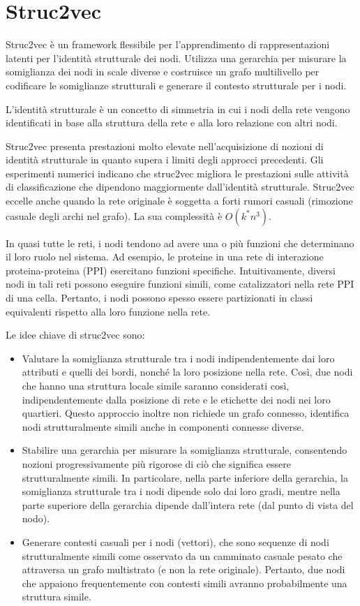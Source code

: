 \documentclass[11pt]{article}
\begin{document}
\pagebreak
\section{Struc2vec}
Struc2vec è un framework flessibile per l'apprendimento di rappresentazioni latenti per l'identità strutturale dei nodi.
Utilizza una gerarchia per misurare la somiglianza dei nodi in scale diverse e costruisce un grafo multilivello per codificare le somiglianze strutturali e generare il contesto strutturale per i nodi.

L'identità strutturale è un concetto di simmetria in cui i nodi della rete vengono identificati in base alla struttura della rete e alla loro relazione con altri nodi.

Struc2vec presenta prestazioni molto elevate nell'acquisizione di nozioni di identità strutturale in quanto supera i limiti degli approcci precedenti.
Gli esperimenti numerici indicano che struc2vec migliora le prestazioni sulle attività di classificazione che dipendono maggiormente dall'identità strutturale.
Struc2vec eccelle anche quando la rete originale è soggetta a forti rumori casuali (rimozione casuale degli archi nel grafo).
La sua complessità è $O(k^*n^3)$.

In quasi tutte le reti, i nodi tendono ad avere una o più funzioni che determinano il loro ruolo nel sistema. Ad esempio, le proteine in una rete di interazione proteina-proteina (PPI) esercitano funzioni specifiche. 
Intuitivamente, diversi nodi in tali reti possono eseguire funzioni simili, come catalizzatori nella rete PPI di una cella. Pertanto, i nodi possono spesso essere partizionati in classi equivalenti rispetto alla loro funzione nella rete.

Le idee chiave di struc2vec sono:
\begin{itemize}
  \item Valutare la somiglianza strutturale tra i nodi indipendentemente dai loro attributi e quelli dei bordi, nonché la loro posizione nella rete.
Così, due nodi che hanno una struttura locale simile saranno considerati così, indipendentemente dalla posizione di rete e le etichette dei nodi nei loro quartieri.
Questo approccio inoltre non richiede un grafo connesso, identifica nodi strutturalmente simili anche in componenti connesse diverse.
  \item Stabilire una gerarchia per misurare la somiglianza strutturale, consentendo nozioni progressivamente più rigorose di ciò che significa essere strutturalmente simili.
In particolare, nella parte inferiore della gerarchia, la somiglianza strutturale tra i nodi dipende solo dai loro gradi, mentre nella parte superiore della gerarchia dipende dall'intera rete (dal punto di vista del nodo).
  \item Generare contesti casuali per i nodi (vettori), che sono sequenze di nodi strutturalmente simili come osservato da un camminato casuale pesato che attraversa un grafo multistrato (e non la rete originale). 
Pertanto, due nodi che appaiono frequentemente con contesti simili avranno probabilmente una struttura simile.
\end{itemize}
\end{document}
